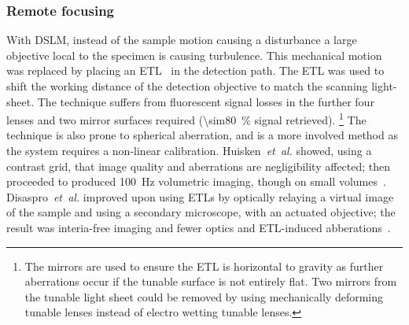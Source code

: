 \subsubsection{Remote focusing}

With \gls{DSLM}, instead of the sample motion causing a disturbance a large objective local to the specimen is causing turbulence.
This mechanical motion was replaced by placing an
\gls{ETL}~\cite{fahrbach_rapid_2013-1} in the detection path.
The \gls{ETL} was used to shift the \gls{working distance} of the detection objective to match the scanning \gls{light-sheet}.
The technique suffers from fluorescent signal losses in the further four lenses and two mirror surfaces required (\SI{\sim80}{\%} signal retrieved).
\footnote{The mirrors are used to ensure the \gls{ETL} is horizontal to gravity as further aberrations occur if the tunable surface is not entirely flat.
Two mirrors from the tunable light sheet could be removed by using mechanically deforming tunable lenses instead of electro wetting tunable lenses.}
The technique is also prone to spherical aberration, and is a more involved method as the system requires a non-linear calibration.
Huisken~\emph{et~al.} showed, using a contrast grid, that image quality and aberrations are negligibility affected; then proceeded to produced \SI{100}{\hertz} volumetric imaging, though on small volumes~\cite{fahrbachRapid3DLightsheet2013}.
Disaspro~\emph{et~al.} improved upon using \gls{ETL}s by optically relaying a virtual image of the sample and using a secondary microscope, with an actuated objective; the result was interia-free imaging and fewer optics and \gls{ETL}-induced abberations~\cite{duocastellaFastInertiaFreeVolumetric2017c}.



